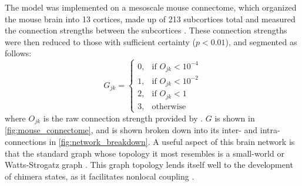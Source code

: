 The model was implemented on a mesoscale mouse connectome, which organized the mouse brain into 13 cortices, made up of 213 subcortices total and measured the connection strengths between the subcortices \cite{Oh2014}.
These connection strengths were then reduced to those with sufficient certainty ($p < 0.01$), and segmented as follows:
\begin{equation}
  \label{eq:mouse_segmentation}
  G_{j k}
  =
  \begin{cases}
    0, & \text{if } O_{j k} < 10^{-4} \\
    1, & \text{if } O_{j k} < 10^{-2} \\
    2, & \text{if } O_{j k} < 1 \\
    3, & \text{otherwise}
  \end{cases}
\end{equation}
where $O_{j k}$ is the raw connection strength provided by \cite{Oh2014}.
$G$ is shown in \cref{fig:mouse_connectome}, and is shown broken down into its inter- and intra-connections in \cref{fig:network_breakdown}.
A useful aspect of this brain network is that the standard graph whose topology it most resembles is a small-world or Watts-Strogatz graph \cite{Oh2014}.
This graph topology lends itself well to the development of chimera states, as it facilitates nonlocal coupling \cite{Hizanidis2016}.

